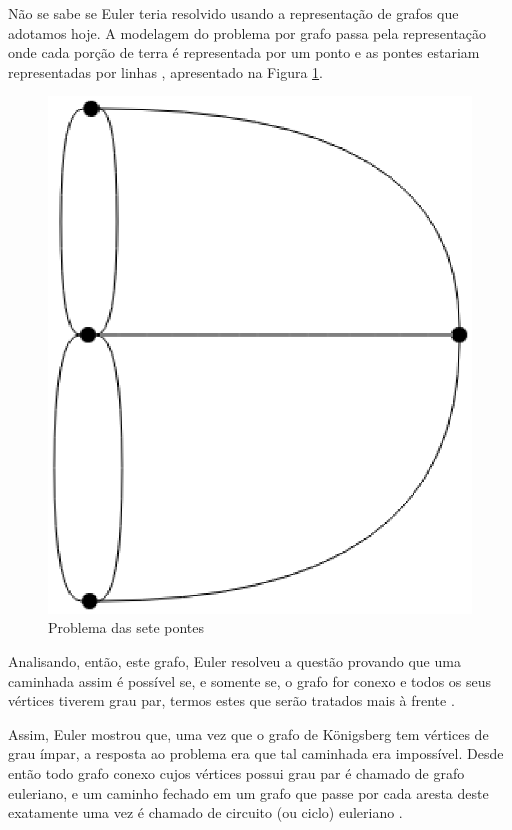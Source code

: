 Não se sabe se Euler teria resolvido usando a representação de grafos que adotamos hoje. A modelagem do problema por grafo passa pela representação onde cada porção de terra  é representada por um ponto e as pontes estariam representadas por linhas \cite{Ore:1963}, apresentado na Figura \ref{sete_pontes}.

\begin{figure}[!h]
	\centering
	\includegraphics[scale=0.5]{figuras/capitulo2/sete_pontes.eps}
	\caption{Problema das sete pontes}
	\label{sete_pontes}
\end{figure}

Analisando, então, este grafo, Euler resolveu a questão provando que uma caminhada assim é possível se, e somente se, o grafo for conexo e todos os seus vértices tiverem grau par, termos estes que serão tratados mais à frente \cite{Malta:2008}.

Assim, Euler mostrou que, uma vez que o grafo de Königsberg tem vértices de grau ímpar, a resposta ao problema era que tal caminhada era impossível. Desde então todo grafo conexo cujos vértices possui grau par é chamado de grafo euleriano, e um caminho fechado em um grafo que passe por cada aresta deste exatamente uma vez é chamado de circuito (ou ciclo) euleriano \cite{Malta:2008}.

